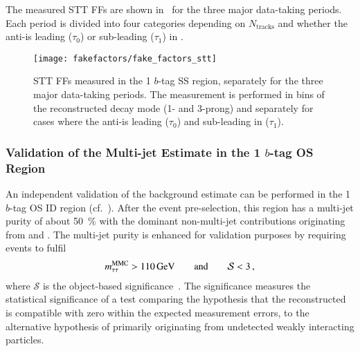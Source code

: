 
The measured STT FFs are shown in~ for the three major
data-taking periods. Each period is divided into four categories depending on
$N_{\text{tracks}}$ and whether the anti-\tauhadvis is leading ($\tau_0$) or
sub-leading ($\tau_1$) in \pT.

\begin{figure}[htbp]
  \centering

  \texttt{[image: fakefactors/fake\_factors\_stt]}

  \caption{STT FFs measured in the 1 $b$-tag SS region, separately for the three
    major data-taking periods. The measurement is performed in bins of the
    reconstructed \tauhadvis decay mode (1- and 3-prong) and separately for
    cases where the anti-\tauhadvis is leading ($\tau_0$) and sub-leading in \pT
    ($\tau_1$).}%
  \label{fig:mjfakes_stt_ffs}
\end{figure}


\subsubsection{Validation of the Multi-jet Estimate in the 1 $b$-tag OS Region}

An independent validation of the background estimate can be performed in the 1
$b$-tag OS ID region (cf.\ ).
After the event pre-selection, this region has a multi-jet purity of about
\SI{50}{\percent} with the dominant non-multi-jet contributions originating from
\Zjets and \ttbar. The multi-jet purity is enhanced for validation purposes by
requiring events to fulfil
\begin{align*}
  m_{\tau\tau}^\text{MMC} > \SI{110}{\ensuremath{\text{GeV}}} \qquad \text{and} \qquad \mathcal{S} < 3 \,\text{,}
\end{align*}
where $\mathcal{S}$ is the object-based \pTmissAbs
significance~\cite{ATLAS-CONF-2018-038}. The \pTmissAbs significance measures
the statistical significance of a test comparing the hypothesis that the
reconstructed \pTmissAbs is compatible with zero within the expected measurement
errors, to the alternative hypothesis of \pTmissAbs primarily originating from
undetected weakly interacting particles.

